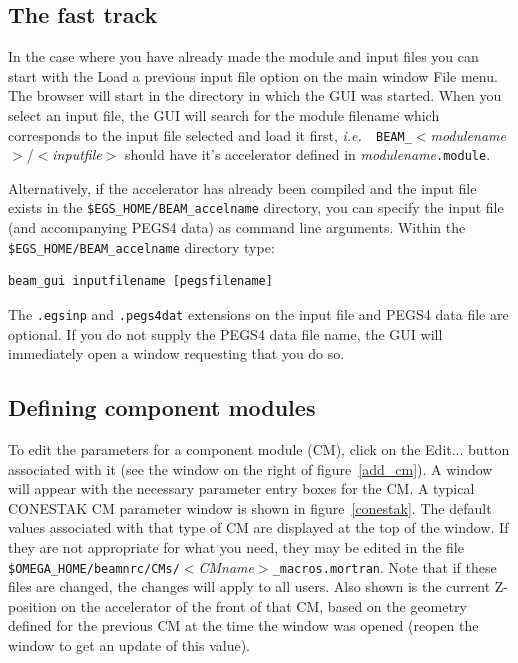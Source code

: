 \documentclass[12pt,twoside]{article}
\newcommand{\ie}{{\em i.e.}}
\begin{document}
\subsection{The fast track}

In the case where you have already made the module and input files you can start with the {\sf Load a
previous input file} option on the main window {\sf File} menu.  The browser
will start in the directory in which the GUI was started.  When you
select an input file, the GUI will search for the module filename which
corresponds to the input file selected and load it first, \ie~{\tt
BEAM\_}$<${\em modulename}$>$/$<${\em inputfile}$>$ should have it's
accelerator defined in {\em modulename}{\tt .module}.

Alternatively, if the accelerator has already been compiled and the input file exists
in the {\tt \$EGS\_HOME/BEAM\_accelname} directory, you can specify the input file
(and accompanying PEGS4 data) as command line arguments.  Within the
{\tt \$EGS\_HOME/BEAM\_accelname} directory type:
\begin{verbatim}
beam_gui inputfilename [pegsfilename]
\end{verbatim}
The {\tt .egsinp} and {\tt .pegs4dat} extensions on the input file and PEGS4 data file are
optional.  If you do not supply the PEGS4 data file name, the GUI will immediately
open a window requesting that you do so.

\subsection{Defining component modules}

To edit the parameters for a component module (CM), click on the {\sf
Edit...} button associated with it (see the window on the right of
figure~\ref{add_cm}). A window will appear
with the necessary parameter entry boxes for the CM.  A typical CONESTAK
CM parameter window is shown in figure~\ref{conestak}.  The default
values associated with that type of CM are displayed at the top of the
window.  If they are not appropriate for what you need, they may be
edited in the file
{\tt \$OMEGA\_HOME/beamnrc/CMs/}$<${\em CMname}$>${\tt \_macros.mortran}.
Note that if these files are changed, the changes will apply to all
users.  Also
shown is the current Z-position on the accelerator of the front of that
CM, based on the geometry defined for the previous CM at the time the
window was opened (reopen the window to get an update of this value).
\end{document}
